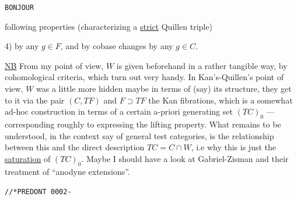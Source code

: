 \texttt{BONJOUR}



following properties (characterizing a \uline{strict} Quillen triple)

4)   by any $g\in F$, and by cobase changes by any $g\in C$.


\uline{NB} From my point of view, $W$ is given beforehand in a rather tangible way, by cohomological criteria, which turn out very handy. In Kan's-Quillen's point of view, $W$ was a little more hidden maybe in terms of (say) its structure, they get to it via  the pair $(C,TF)$ and $F\supset TF$ the Kan fibrations, which is a somewhat ad-hoc construction in terms of a certain  a-priori generating set $(TC)_0$ --- corresponding roughly to expressing the  lifting property. What remains to be understood, in the context say of general test categories, is the relationship between this and the direct description $TC=C\cap W$,  i.e why this is just the \uline{saturation} of $(TC)_0$. Maybe I should have a look at Gabriel-Zisman and their treatment of ``anodyne extensions''.


\texttt{//*\quad PREDONT 0002\quad - }

